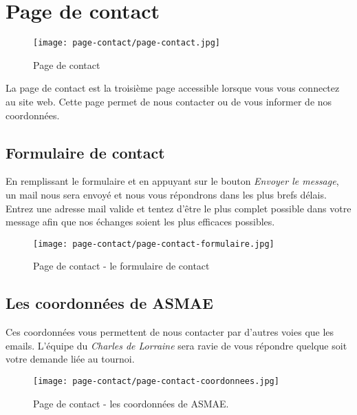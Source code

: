 \section{Page de contact}
\label{Page de contact}

\begin{figure}[H]
\centering
\texttt{[image: page-contact/page-contact.jpg]}
\caption{Page de contact}
\end{figure}

La page de contact est la troisième page accessible lorsque vous vous connectez au site web. Cette page permet de nous contacter ou de vous informer de nos coordonnées.

\subsection{Formulaire de contact}

En remplissant le formulaire et en appuyant sur le bouton \textit{Envoyer le
message}, un mail nous sera envoyé et nous vous répondrons dans les plus brefs
délais. Entrez une adresse mail valide et tentez d'être le plus complet
possible dans votre message afin que nos échanges soient les plus efficaces
possibles.

\begin{figure}[H]
\centering
\texttt{[image: page-contact/page-contact-formulaire.jpg]}
\caption{Page de contact - le formulaire de contact}
\end{figure}

\subsection{Les coordonnées de ASMAE}

Ces coordonnées vous permettent de nous contacter par d'autres voies que les
emails. L'équipe du \textit{Charles de Lorraine} sera ravie de vous répondre quelque
soit votre demande liée au tournoi.

\begin{figure}[H]
\centering
\texttt{[image: page-contact/page-contact-coordonnees.jpg]}
\caption{Page de contact - les coordonnées de ASMAE.}
\end{figure}
